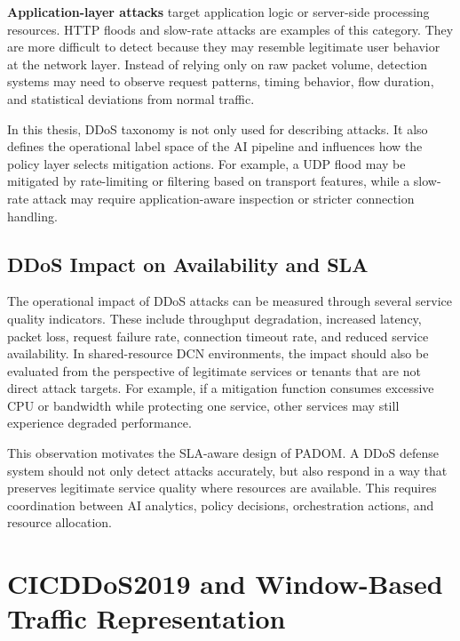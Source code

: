 \documentclass[12pt, a4paper, reqno, oneside]{book}
\newcommand{\padonap}{\textsc{PADOM}}
\begin{document}
\textbf{Application-layer attacks} target application logic or server-side
processing resources. HTTP floods and slow-rate attacks are examples of this
category. They are more difficult to detect because they may resemble
legitimate user behavior at the network layer. Instead of relying only on raw
packet volume, detection systems may need to observe request patterns, timing
behavior, flow duration, and statistical deviations from normal traffic.

In this thesis, DDoS taxonomy is not only used for describing attacks. It also
defines the operational label space of the AI pipeline and influences how the
policy layer selects mitigation actions. For example, a UDP flood may be
mitigated by rate-limiting or filtering based on transport features, while a
slow-rate attack may require application-aware inspection or stricter
connection handling.

\subsection{DDoS Impact on Availability and SLA}
\label{subsec:ddos-sla-impact}

The operational impact of DDoS attacks can be measured through several service
quality indicators. These include throughput degradation, increased latency,
packet loss, request failure rate, connection timeout rate, and reduced service
availability. In shared-resource DCN environments, the impact should also be
evaluated from the perspective of legitimate services or tenants that are not
direct attack targets. For example, if a mitigation function consumes excessive
CPU or bandwidth while protecting one service, other services may still
experience degraded performance.

This observation motivates the SLA-aware design of \padonap{}. A DDoS defense
system should not only detect attacks accurately, but also respond in a way
that preserves legitimate service quality where resources are available. This
requires coordination between AI analytics, policy decisions, orchestration
actions, and resource allocation.

\section{CICDDoS2019 and Window-Based Traffic Representation}
\label{sec:cic-bg}
\end{document}
